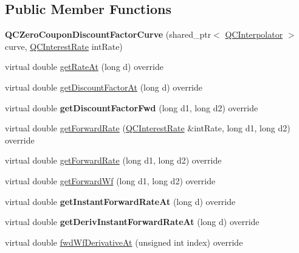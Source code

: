 \subsection*{Public Member Functions}
\begin{DoxyCompactItemize}
\item 
\hypertarget{class_q_c_zero_coupon_discount_factor_curve_a25350242d9f5a47d8b271d77dcbbc61c}{{\bfseries Q\+C\+Zero\+Coupon\+Discount\+Factor\+Curve} (shared\+\_\+ptr$<$ \hyperlink{class_q_c_interpolator}{Q\+C\+Interpolator} $>$ curve, \hyperlink{class_q_c_interest_rate}{Q\+C\+Interest\+Rate} int\+Rate)}\label{class_q_c_zero_coupon_discount_factor_curve_a25350242d9f5a47d8b271d77dcbbc61c}

\item 
virtual double \hyperlink{class_q_c_zero_coupon_discount_factor_curve_a00da6a6176e027de613935504683e254}{get\+Rate\+At} (long d) override
\item 
virtual double \hyperlink{class_q_c_zero_coupon_discount_factor_curve_a1c09de3cfa88c80f8ece2feac6905c0d}{get\+Discount\+Factor\+At} (long d) override
\item 
\hypertarget{class_q_c_zero_coupon_discount_factor_curve_a9befe6e28f78e8d5e634914a953d0acb}{virtual double {\bfseries get\+Discount\+Factor\+Fwd} (long d1, long d2) override}\label{class_q_c_zero_coupon_discount_factor_curve_a9befe6e28f78e8d5e634914a953d0acb}

\item 
virtual double \hyperlink{class_q_c_zero_coupon_discount_factor_curve_a444623664ba1bd0d0855bc11cbde64dd}{get\+Forward\+Rate} (\hyperlink{class_q_c_interest_rate}{Q\+C\+Interest\+Rate} \&int\+Rate, long d1, long d2) override
\item 
virtual double \hyperlink{class_q_c_zero_coupon_discount_factor_curve_a9287f90424bfa40964835df46d3e3601}{get\+Forward\+Rate} (long d1, long d2) override
\item 
virtual double \hyperlink{class_q_c_zero_coupon_discount_factor_curve_ab9b135fa9deab14e415f95d619c1bfae}{get\+Forward\+Wf} (long d1, long d2) override
\item 
\hypertarget{class_q_c_zero_coupon_discount_factor_curve_a906f9c8951880ed584e8104168fdf14d}{virtual double {\bfseries get\+Instant\+Forward\+Rate\+At} (long d) override}\label{class_q_c_zero_coupon_discount_factor_curve_a906f9c8951880ed584e8104168fdf14d}

\item 
\hypertarget{class_q_c_zero_coupon_discount_factor_curve_aeb4a1654dbec9d763e9b9c00dfeb62a7}{virtual double {\bfseries get\+Deriv\+Instant\+Forward\+Rate\+At} (long d) override}\label{class_q_c_zero_coupon_discount_factor_curve_aeb4a1654dbec9d763e9b9c00dfeb62a7}

\item 
virtual double \hyperlink{class_q_c_zero_coupon_discount_factor_curve_a336906041380286ee1f8257d9a97e486}{fwd\+Wf\+Derivative\+At} (unsigned int index) override
\end{DoxyCompactItemize}

